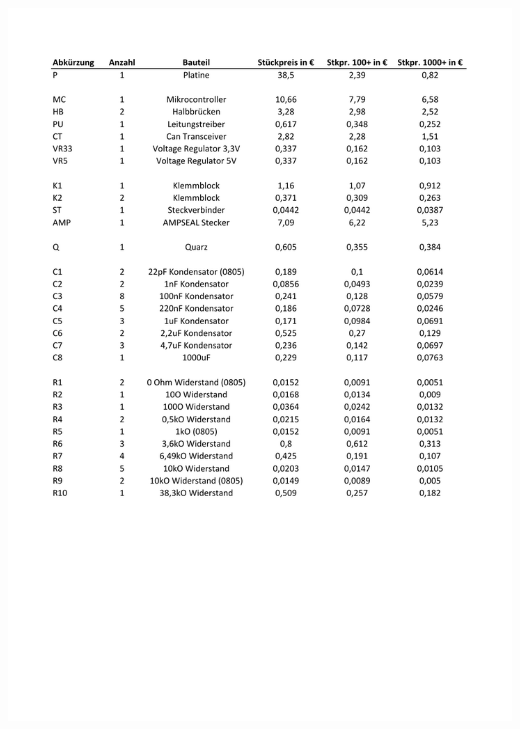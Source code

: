 \begin{center}
	\includegraphics[page=2,width=\columnwidth]{./datenblaetter/Gesamtkosten}
\end{center}
